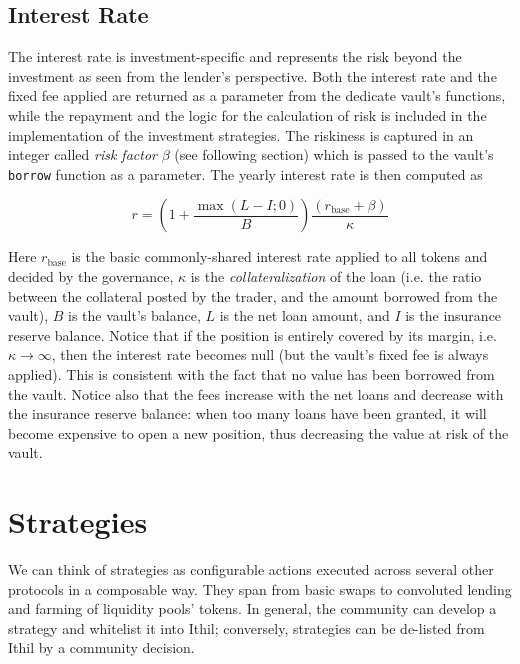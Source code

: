 \documentclass[a4paper,10 pt]{article}
\theoremstyle{definition}
\begin{document}
\subsection{Interest Rate}

The interest rate is investment-specific and represents the risk beyond the investment as seen from the lender's perspective.
Both the interest rate and the fixed fee applied are returned as a parameter from the dedicate vault’s functions, while the repayment and the logic for the calculation of risk is included in the implementation of the investment strategies. The riskiness is captured in an integer called {\it risk factor} $\beta$ (see following section) which is passed to the vault's \verb|borrow| function as a parameter. The yearly interest rate is then computed as

\begin{equation}\label{interestrate}r =  \left(1+\frac{\max{(L-I;0)}}{B}\right)\frac{(r_{\text{base}} + \beta)}{\kappa}\end{equation}

Here $r_{\text{base}}$ is the basic commonly-shared interest rate applied to all tokens and decided by the governance, $\kappa$ is the {\it collateralization} of the loan (i.e. the ratio between the collateral posted by the trader, and the amount borrowed from the vault), $B$ is the vault's balance, $L$ is the net loan amount, and $I$ is the insurance reserve balance. Notice that if the position is entirely covered by its margin, i.e. $\kappa \rightarrow \infty$, then the interest rate becomes null (but the vault's fixed fee is always applied). This is consistent with the fact that no value has been borrowed from the vault. Notice also that the fees increase with the net loans and decrease with the insurance reserve balance: when too many loans have been granted, it will become expensive to open a new position, thus decreasing the value at risk of the vault.

\section{Strategies}
We can think of strategies as configurable actions executed across several other protocols in a composable way. They span from basic swaps to convoluted lending and farming of liquidity pools' tokens. In general, the community can develop a strategy and whitelist it into Ithil; conversely, strategies can be de-listed from Ithil by a community decision.
\end{document}
